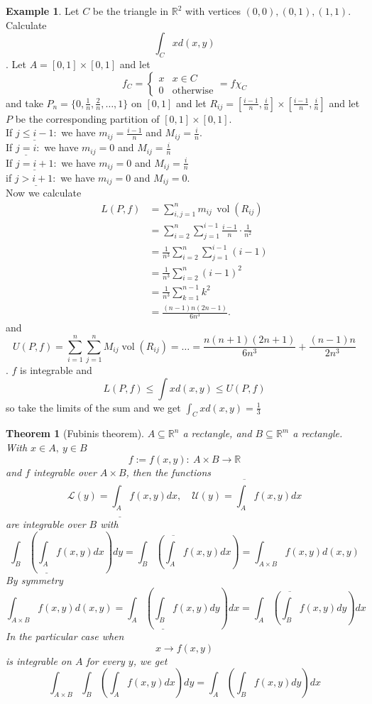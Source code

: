 \documentclass[11pt,openany]{book}
\theoremstyle{plain}
\newtheorem{theorem}{Theorem}[chapter]
\theoremstyle{definition}
\newtheorem{example}{Example}[chapter]
\theoremstyle{remark}
\newcommand{\R}{\mathbb{R}}
\newcommand{\vol}{\operatorname{vol}}
\begin{document}
\begin{example}
    Let $C$ be the triangle in $\R^2$ with vertices $(0,0),(0,1),(1,1)$. Calculate \[\int_C xd(x,y)\]. Let $A = [0 ,1] \times [0,1]$ and let \[f_C = \begin{cases}
        x & x \in C \\
        0 & \text{otherwise}
    \end{cases} = f\chi_C\] and take $P_n = \{0, \frac1n, \frac2n, \dots , 1\}$ on $[0,1]$ and let $R_{ij} = [\frac{i-1}{n}, \frac{i}{n}] \times [\frac{i-1}{n}, \frac{i}{n}]$ and let $P$ be the corresponding partition of $[0,1]\times [0,1]$.\\ If $\underline{j \le i-1}:$ we have $m_{ij} = \frac{i-1}{n}$ and $M_{ij} = \frac{i}{n}$.\\ If $\underline{j = i}:$ we have $m_{ij} = 0$ and $M_{ij} = \frac{i}{n}$ \\ If $\underline{j = i+1}:$ we have $m_{ij} = 0$ and $M_{ij} = \frac{i}{n}$\\ if $\underline{j > i+1:}$ we have $m_{ij} = 0$ and $M_{ij} = 0$. \\ Now we calculate \[
\begin{aligned}
L(P,f)
&= \sum_{i,j=1}^n m_{ij}\,\vol(R_{ij}) \\
&= \sum_{i=2}^n \sum_{j=1}^{i-1} \frac{i-1}{n}\cdot \frac{1}{n^2} \\
&= \frac{1}{n^3} \sum_{i=2}^n \sum_{j=1}^{i-1} (i-1) \\
&= \frac{1}{n^3} \sum_{i=2}^n (i-1)^2 \\
&= \frac{1}{n^3} \sum_{k=1}^{n-1} k^2 \\
&= \frac{(n-1)n(2n-1)}{6n^3}.
\end{aligned}
\] and \[U(P,f) =  \sum_{i =1 }^n \sum_{j = 1}^n M_{ij}\vol(R_{ij}) = \dots = \frac{n(n+1)(2n+1)}{6n^3}+\frac{(n-1)n}{2n^3}\]. $f$ is integrable and \[L(P,f) \le \int xd(x,y) \le U(P,f) \] so  take the limits of the sum and we get $ \int_C xd(x,y) = \frac13$ 
\end{example}
\begin{theorem}[Fubinis theorem]
     $A \subseteq \R^n$ a rectangle, and $B \subseteq \R^m$ a rectangle. With $x\in A, \ y \in B$ 
    $$f := f(x,y) \colon \ A \times B \to \R$$
    and $f$ integrable over $A \times B$, then the functions
    $$\mathcal{L}(y) = \underline{\int_A} f(x,y) dx, \quad \mathcal{U}(y) = \overline{\int_A} f(x,y) dx$$
    are integrable over $B$ with 
    $$\int_B \left(\underline{\int_A}f(x,y) dx\right) dy = \int_B \left(\overline{\int_A}f(x,y) dx\right) = \int_{A \times B} f(x,y) d(x,y)$$
    By symmetry 
    $$\int_{A \times B} f(x,y) d(x,y)= \int_A \left(\underline{\int_B}f(x,y) dy\right) dx = \int_A \left(\overline{\int_B}f(x,y) dy\right) dx$$
    In the particular case when 
    $$x \to f(x,y)$$
    is integrable on $A$ for every $y$, we get 
    $$\int_{A \times B} \int_B \left(\int_A f(x,y) dx\right) dy = \int_A \left(\int_B f(x,y) dy\right) dx$$
\end{theorem}
\end{document}
